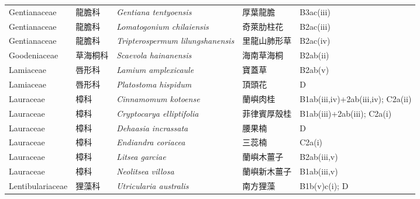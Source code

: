 {\begin{longtable}{p{2.5cm}p{2.5cm}p{4.5cm}p{2.5cm}p{3cm}}
    Gentianaceae & 龍膽科 & \textit{Gentiana tentyoensis}  & 厚葉龍膽 & B3ac(iii) \index{Gentiana@\textit{Gentiana}!tentyoensis@\textit{tentyoensis}}  \index{厚葉龍膽} \\
    Gentianaceae & 龍膽科 & \textit{Lomatogonium chilaiensis}  & 奇萊肋柱花 & B2ac(iii) \index{Lomatogonium@\textit{Lomatogonium}!chilaiensis@\textit{chilaiensis}}  \index{奇萊肋柱花} \\
    Gentianaceae & 龍膽科 & \textit{Tripterospermum lilungshanensis}  & 里龍山肺形草 & B2ac(iv) \index{Tripterospermum@\textit{Tripterospermum}!lilungshanensis@\textit{lilungshanensis}}  \index{里龍山肺形草} \\
    Goodeniaceae & 草海桐科 & \textit{Scaevola hainanensis}  & 海南草海桐 & B2ab(ii) \index{Scaevola@\textit{Scaevola}!hainanensis@\textit{hainanensis}}  \index{海南草海桐} \\
    Lamiaceae & 唇形科 & \textit{Lamium amplexicaule}  & 寶蓋草 & B2ab(v) \index{Lamium@\textit{Lamium}!amplexicaule@\textit{amplexicaule}}  \index{寶蓋草} \\
    Lamiaceae & 唇形科 & \textit{Platostoma hispidum}  & 頂頭花 & D \index{Platostoma@\textit{Platostoma}!hispidum@\textit{hispidum}}  \index{頂頭花} \\
    Lauraceae & 樟科 & \textit{Cinnamomum kotoense}  & 蘭嶼肉桂 & B1ab(iii,iv)+2ab(iii,iv); C2a(ii) \index{Cinnamomum@\textit{Cinnamomum}!kotoense@\textit{kotoense}}  \index{蘭嶼肉桂} \\
    Lauraceae & 樟科 & \textit{Cryptocarya elliptifolia}  & 菲律賓厚殼桂 & B1ab(iii)+2ab(iii); C2a(i) \index{Cryptocarya@\textit{Cryptocarya}!elliptifolia@\textit{elliptifolia}}  \index{菲律賓厚殼桂} \\
    Lauraceae & 樟科 & \textit{Dehaasia incrassata}  & 腰果楠 & D \index{Dehaasia@\textit{Dehaasia}!incrassata@\textit{incrassata}}  \index{腰果楠} \\
    Lauraceae & 樟科 & \textit{Endiandra coriacea}  & 三蕊楠 & C2a(i) \index{Endiandra@\textit{Endiandra}!coriacea@\textit{coriacea}}  \index{三蕊楠} \\
    Lauraceae & 樟科 & \textit{Litsea garciae}  & 蘭嶼木薑子 & B2ab(iii,v) \index{Litsea@\textit{Litsea}!garciae@\textit{garciae}}  \index{蘭嶼木薑子} \\
    Lauraceae & 樟科 & \textit{Neolitsea villosa}  & 蘭嶼新木薑子 & B1ab(iii,v) \index{Neolitsea@\textit{Neolitsea}!villosa@\textit{villosa}}  \index{蘭嶼新木薑子} \\
    Lentibulariaceae & 狸藻科 & \textit{Utricularia australis}  & 南方狸藻 & B1b(v)c(i); D \index{Utricularia@\textit{Utricularia}!australis@\textit{australis}}  \index{南方狸藻} \\

\end{longtable}}
